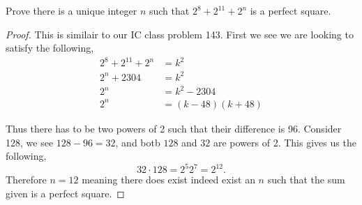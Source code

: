 \documentclass[11pt]{article}
\newenvironment{problem}[2][Problem\!]{\begin{trivlist}
\item[\hskip \labelsep {\bfseries #1}\hskip \labelsep {\bfseries #2}]}{\end{trivlist}}
\begin{document}
\begin{tcolorbox}
    \begin{problem} {OC | 11/12 | 90.}
        Prove there is a unique integer $n$ such that $2^{8} + 2^{11} + 2^{n}$ is a perfect square.
    \end{problem}
\end{tcolorbox}
\begin{proof}
    This is similair to our IC class problem 143. First we see we are looking to satisfy the following,
    \begin{align*}
        2^{8} + 2^{11} + 2^{n} &= k^{2} \\
        2^{n} + 2304 &= k^{2} \\
        2^{n} &= k^{2} - 2304 \\
        2^{n} &= (k - 48)(k+48)
    \end{align*}

    Thus there has to be two powers of 2 such that their difference is 96. Consider 128, we see $128-96 = 32$, and botb $128$ and $32$ are powers of 2. This gives us the following,
    \[32 \cdot 128 = 2^{5} 2^{7} = 2^{12}.\]
    Therefore $n =12$ meaning there does exist indeed exist an $n$ such that the sum given is a perfect square.
\end{proof}
\end{document}
